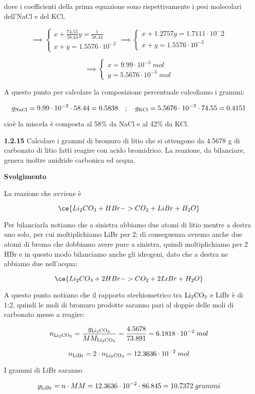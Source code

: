 dove i coefficienti della prima equazione sono rispettivamente i pesi molecolari dell'NaCl e del KCl.

$$\implies
\begin{cases}
    x + \displaystyle \frac{74.55}{58.44}y=\displaystyle \frac{1}{58.44}\\[0.2cm]
    x+y=1.5576 \cdot 10^{-2}
\end{cases}
\implies
\begin{cases}
    x + 1.2757y=1.7111 \cdot 10^-2\\
    x+y=1.5576 \cdot 10^{-2}
\end{cases}$$

$$\implies
\begin{cases}
    x=9.99 \cdot 10^{-3}\;mol\\
    y=5.5676 \cdot 10^{-3}\;mol
\end{cases}$$

A questo punto per calcolare la composizione percentuale calcoliamo i grammi:

$$g_{\rm NaCl}=9.99 \cdot 10^{-3} \cdot 58.44
=0.5838
\quad;\quad
g_{\rm KCl}=5.5676 \cdot 10^{-3} \cdot 74.55
=0.4151$$

cioè la miscela è composta al 58\% da NaCl e al 42\% da KCl.

\newpage

\vspace{0.2cm}\textbf{1.2.15} Calcolare i grammi di bromuro di litio che si ottengono da 4.5678 g di carbonato di litio fatti reagire con acido bromidrico. La reazione, da bilanciare, genera inoltre anidride carbonica ed acqua.

\vspace{0.2cm}\large\textbf{Svolgimento}\normalsize

\vspace{0.2cm}La reazione che avviene è

$$\ce{Li_2CO_3 + HBr -> CO_2 + LiBr + H_2O}$$

Per bilanciarla notiamo che a sinistra abbiamo due atomi di litio mentre a destra uno solo, per cui moltiplichiamo LiBr per 2; di conseguenza avremo anche due atomi di bromo che dobbiamo avere pure a sinistra, quindi moltiplichiamo per 2 HBr e in questo modo bilanciamo anche gli idrogeni, dato che a destra ne abbiamo due nell'acqua:

$$\ce{Li_2CO_3 + 2HBr -> CO_2 + 2LiBr + H_2O}$$

A questo punto notiamo che il rapporto stechiometrico tra $\rm Li_2CO_3$ e LiBr è di 1:2, quindi le moli di bromuro prodotte saranno pari al doppie delle moli di carbonato messe a reagire:

$$n_{\rm Li_2CO_3}
=\frac{g_{\rm Li_2CO_3}}{MM_{\rm Li_2CO_3}}
=\frac{4.5678}{73.891}=6.1818 \cdot 10^{-2}\;mol$$

$$n_{\rm LiBr}=2 \cdot n_{\rm Li_2CO_3}=12.3636 \cdot 10^{-2}\;mol$$

I grammi di LiBr saranno

$$g_{\rm LiBr}=n \cdot MM=12.3636 \cdot 10^{-2} \cdot 86.845
=10.7372\;grammi$$
